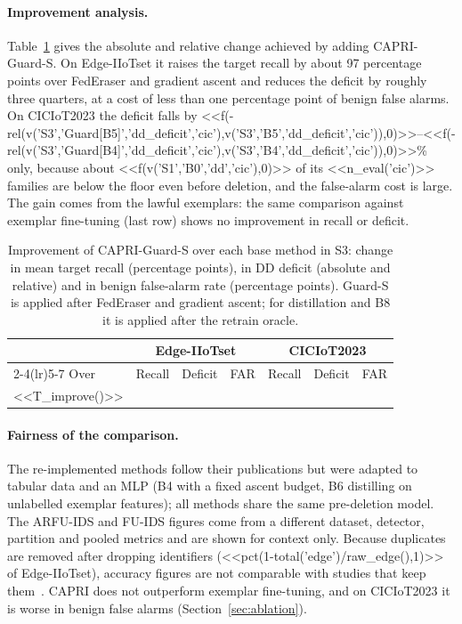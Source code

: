 \documentclass[pdflatex,sn-mathphys-num,iicol]{sn-jnl}
\begin{document}
\paragraph{Improvement analysis.} Table~\ref{tab:improve} gives the absolute and relative change achieved by adding CAPRI-Guard-S. On Edge-IIoTset it raises the target recall by about 97 percentage points over FedEraser and gradient ascent and reduces the deficit by roughly three quarters, at a cost of less than one percentage point of benign false alarms. On CICIoT2023 the deficit falls by <<f(-rel(v('S3','Guard[B5]','dd_deficit','cic'),v('S3','B5','dd_deficit','cic')),0)>>--<<f(-rel(v('S3','Guard[B4]','dd_deficit','cic'),v('S3','B4','dd_deficit','cic')),0)>>\% only, because about <<f(v('S1','B0','dd','cic'),0)>> of its <<n_eval('cic')>> families are below the floor even before deletion, and the false-alarm cost is large. The gain comes from the lawful exemplars: the same comparison against exemplar fine-tuning (last row) shows no improvement in recall or deficit.

\begin{table}[t]
\caption{Improvement of CAPRI-Guard-S over each base method in S3: change in mean target recall (percentage points), in DD deficit (absolute and relative) and in benign false-alarm rate (percentage points). Guard-S is applied after FedEraser and gradient ascent; for distillation and B8 it is applied after the retrain oracle.}\label{tab:improve}
\scriptsize
\setlength{\tabcolsep}{2.5pt}
\begin{tabular*}{\textwidth}{@{\extracolsep\fill}lcccccc}
\toprule
 & \multicolumn{3}{c}{Edge-IIoTset} & \multicolumn{3}{c}{CICIoT2023} \\
\cmidrule(lr){2-4}\cmidrule(lr){5-7}
Over & Recall & Deficit & FAR & Recall & Deficit & FAR \\
\midrule
<<T_improve()>>
\botrule
\end{tabular*}
\end{table}

\paragraph{Fairness of the comparison.} The re-implemented methods follow their publications but were adapted to tabular data and an MLP (B4 with a fixed ascent budget, B6 distilling on unlabelled exemplar features); all methods share the same pre-deletion model. The ARFU-IDS and FU-IDS figures come from a different dataset, detector, partition and pooled metrics and are shown for context only. Because duplicates are removed after dropping identifiers (<<pct(1-total('edge')/raw_edge(),1)>> of Edge-IIoTset), accuracy figures are not comparable with studies that keep them~\cite{bilal2026,peng2025fdids}. CAPRI does not outperform exemplar fine-tuning, and on CICIoT2023 it is worse in benign false alarms (Section~\ref{sec:ablation}).
\end{document}
